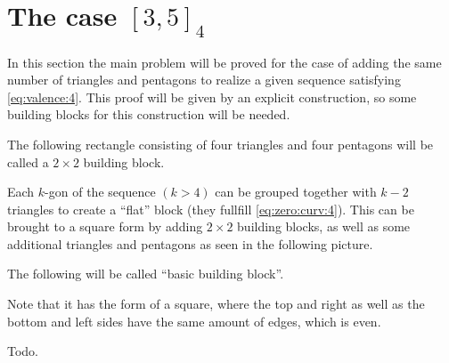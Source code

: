 \section{The case $[3, 5]_4$}
In this section the main problem will be proved for the case of adding the same number of triangles and pentagons to realize a given sequence satisfying \autoref{eq:valence:4}. This proof will be given by an explicit construction, so some building blocks for this construction will be needed.
\begin{definition}
  The following rectangle consisting of four triangles and four pentagons will be called a $2 \times 2$ building block.
  \begin{figure}[htpp]
    \centering
  \end{figure}
\end{definition}

Each $k$-gon of the sequence $(k > 4)$ can be grouped together with $k-2$ triangles to create a ``flat'' block (they fullfill \autoref{eq:zero:curv:4}). This can be brought to a square form by adding $2 \times 2$ building blocks, as well as some additional triangles and pentagons as seen in the following picture.
\begin{definition} The following will be called ``basic building block''.
  \begin{figure}[htpp]
    \centering
  \end{figure}
  Note that it has the form of a square, where the top and right as well as the bottom and left sides have the same amount of edges, which is even.
\end{definition}
Todo.

